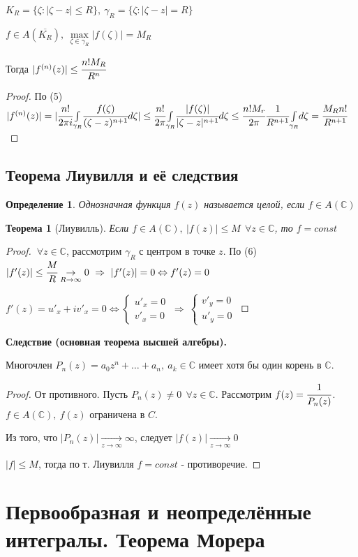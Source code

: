 \documentclass[draft]{report}
\newcommand{\then}{\ \Rightarrow\ }
\renewcommand{\C}{\mathbb{C}}
\newcommand{\mint}[2]{\underset{#1}{\overset{#2}{\int}}}
\newcommand{\mmax}[1]{\underset{#1}{\max}}
\newcommand{\LRA}{\Leftrightarrow}
\renewcommand{\bar}{\overline}
\newcommand{\g}{\gamma}
\newcommand{\F}{\ \forall}
\newcommand{\sys}[1]{\left\{\begin{matrix}#1\end{matrix}\right.}
\newcommand{\opr}[1]{\begin{opred}#1\end{opred}}
\newtheorem*{theor}{Теорема}
\newtheorem*{opred}{Определение}
\theoremstyle{remark}
\begin{document}
$K_R=\{\zeta\colon|\zeta-z|\leq R\},\ \g_R=\{\zeta\colon|\zeta-z|=R\}$

$f\in A(\bar{K_R}),\ \mmax{\zeta\in\g_R}|f(\zeta)|=M_R$

Тогда $|f^{(n)}(z)|\leq\cfrac{n!M_R}{R^n}$
\begin{proof}
По (5) $|f^{(n)}(z)|=|\cfrac{n!}{2\pi i}\mint{\g_R}{}\cfrac{f(\zeta)}{(\zeta-z)^{n+1}}d\zeta|\leq \cfrac {n!}{2\pi}\mint{\g_R}{}\cfrac{|f(\zeta)|}{|\zeta-z|^{n+1}}d\zeta\leq\cfrac{n!M_r}{2\pi}\cfrac1{R^{n+1}}\mint{\g_R}{}d\zeta=\cfrac{M_Rn!}{R^{n+1}}$
\end{proof}

\subsection{Теорема Лиувилля и её следствия}

\opr{Однозначная функция $f(z)$ называется целой, если $f\in A(\C)$}
\begin{theor}[Лиувилль]
Если $f\in A(\C),\ |f(z)|\leq M\ \F z\in \C$, то $f=const$
\end{theor}
\begin{proof}
$\F z\in\C$, рассмотрим $\g_R$ с центром в точке $z$. По (6) $|f'(z)|\leq \cfrac MR\underset{R\to\infty}{\to} 0 \then |f'(z)|=0 \LRA f'(z)=0$

$f'(z)=u'_x+iv'_x=0\LRA \sys{u'_x=0 \\ v'_x=0} \then \sys{v'_y=0 \\ u'_y=0}$
\end{proof}
{\bfseries Следствие (основная теорема высшей алгебры).}

Многочлен $P_n(z)=a_0z^n+\ldots+a_n,\ a_k\in\C$ имеет хотя бы один корень в $\C$.
\begin{proof}
От противного. Пусть $P_n(z)\neq0\ \F z\in\C$. Рассмотрим $f(z)=\cfrac 1{P_n(z)}$. $f\in A(\C),\ f(z)$ ограничена в $C$.

Из того, что $|P_n(z)|\underset{z\to\infty}{\to}\infty$, следует $|f(z)|\underset{z\to\infty}{\to}0$

$|f|\leq M$, тогда по т. Лиувилля $f=const$ - противоречие.
\end{proof}

\section{Первообразная и неопределённые интегралы. Теорема Морера}

\subsection{ }
\end{document}
